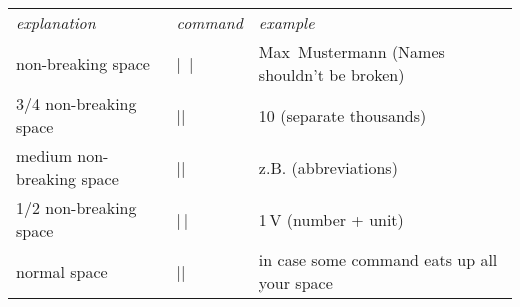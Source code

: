                 \smallskip
                \begin{tabular}{l l l}
                    \emph{explanation} & \emph{command} & \emph{example} \\
                    non-breaking space & |~| & Max~Mustermann (Names shouldn't be broken) \\
                    3/4 non-breaking space & |\;| & 10\;000 (separate thousands)\\
                    medium non-breaking space & |\:| & z.\:B. (abbreviations) \\
                    1/2 non-breaking space & |\,| & 1\,V (number + unit) \\
                    normal space & |\space| & in case some command eats up all your space \\
                \end{tabular}
